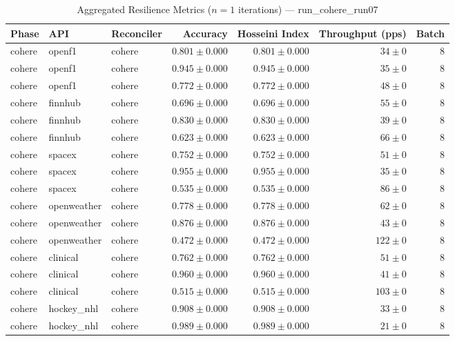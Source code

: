 
\begin{table}[htbp]
\caption{Aggregated Resilience Metrics ($n=1$ iterations) --- run_cohere_run07}
\begin{tabular}{l l l r r r r}
\hline
Phase & API & Reconciler & Accuracy & Hosseini Index & Throughput (pps) & Batch \\
\hline
cohere & openf1 & cohere & $0.801\pm0.000$ & $0.801\pm0.000$ & $34\pm0$ & 8 \\
cohere & openf1 & cohere & $0.945\pm0.000$ & $0.945\pm0.000$ & $35\pm0$ & 8 \\
cohere & openf1 & cohere & $0.772\pm0.000$ & $0.772\pm0.000$ & $48\pm0$ & 8 \\
cohere & finnhub & cohere & $0.696\pm0.000$ & $0.696\pm0.000$ & $55\pm0$ & 8 \\
cohere & finnhub & cohere & $0.830\pm0.000$ & $0.830\pm0.000$ & $39\pm0$ & 8 \\
cohere & finnhub & cohere & $0.623\pm0.000$ & $0.623\pm0.000$ & $66\pm0$ & 8 \\
cohere & spacex & cohere & $0.752\pm0.000$ & $0.752\pm0.000$ & $51\pm0$ & 8 \\
cohere & spacex & cohere & $0.955\pm0.000$ & $0.955\pm0.000$ & $35\pm0$ & 8 \\
cohere & spacex & cohere & $0.535\pm0.000$ & $0.535\pm0.000$ & $86\pm0$ & 8 \\
cohere & openweather & cohere & $0.778\pm0.000$ & $0.778\pm0.000$ & $62\pm0$ & 8 \\
cohere & openweather & cohere & $0.876\pm0.000$ & $0.876\pm0.000$ & $43\pm0$ & 8 \\
cohere & openweather & cohere & $0.472\pm0.000$ & $0.472\pm0.000$ & $122\pm0$ & 8 \\
cohere & clinical & cohere & $0.762\pm0.000$ & $0.762\pm0.000$ & $51\pm0$ & 8 \\
cohere & clinical & cohere & $0.960\pm0.000$ & $0.960\pm0.000$ & $41\pm0$ & 8 \\
cohere & clinical & cohere & $0.515\pm0.000$ & $0.515\pm0.000$ & $103\pm0$ & 8 \\
cohere & hockey\_nhl & cohere & $0.908\pm0.000$ & $0.908\pm0.000$ & $33\pm0$ & 8 \\
cohere & hockey\_nhl & cohere & $0.989\pm0.000$ & $0.989\pm0.000$ & $21\pm0$ & 8 \\

\end{tabular}
\end{table}
